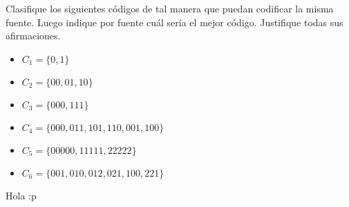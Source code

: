 
Clasifique los siguientes códigos de tal manera que puedan codificar la misma fuente. Luego indique por fuente cuál sería el mejor código. Justifique todas sus afirmaciones.
\begin{itemize}
\item $C_1=\{0,1\}$
\item $C_2=\{00,01,10\}$
\item $C_3=\{000,111\}$
\item $C_4=\{000,011,101,110,001,100\}$
\item $C_5=\{00000,11111,22222\}$
\item $C_6=\{001,010,012,021,100,221\}$
\end{itemize}
\begin{sol}
    Hola :p
\end{sol}